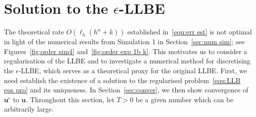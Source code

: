 \documentclass[11pt,reqno]{amsart}
\theoremstyle{definition}
\numberwithin{equation}{section}
\newcommand{\bff}{\boldsymbol}
\newcommand{\bb}{\mathbb}
\newcommand{\nn}{\nonumber}
\newcommand{\norm}[2]{\left\|{#1}\right\|_{#2}}
\begin{document}








\section{Solution to the $\epsilon$-LLBE}\label{sec:reg tec}

{The theoretical rate $O(\ell_h(h^\alpha+k))$ established in~\eqref{equ:err est} is not optimal in light of the numerical results from Simulation 1 in Section~\ref{sec:num sim}; see Figures~\ref{fig:order sim4} and~\ref{fig:order exp 1b k}.}
This motivates us to consider a regularisation of the LLBE and to investigate a numerical method for discretising the $\epsilon$-LLBE, which serves as a theoretical proxy for the original LLBE. First, we need establish the existence of a solution to the regularised problem~\eqref{equ:LLB eps pro} and its uniqueness. In Section~\ref{sec:conver}, we then show convergence of $\bff{u}^\epsilon$ to $\bff{u}$. Throughout this section, let $T>0$ be a given number which can be arbitrarily large. 
\end{document}
